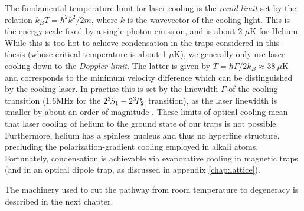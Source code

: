 
	The fundamental temperature limit for laser cooling is the \emph{recoil limit} set by the relation $k_B T = \hbar^2k^2/2m$, where $k$ is the wavevector of the cooling light.
	This is the energy scale fixed by a single-photon emission, and is about 2 $\mu$K for Helium.
	While this is too hot to achieve condensation in the traps considered in this thesis (whose critical temperature is about 1 $\mu$K), we generally only use laser cooling down to the \emph{Doppler limit}.
	The latter is given by $T = \hbar\Gamma/2 k_B\approx 38~\mu$K and corresponds to the minimum velocity difference which can be distinguished by the cooling laser.
	In practise this is set by the linewidth $\Gamma$ of the cooling transition (1.6MHz for the $2^{3\!} S_1 - 2^{3\!} P_2$ transition), as the laser linewidth is smaller by about an order of magnitude \cite{Shin16}.
	These limits of optical cooling mean that laser cooling of helium to the ground state of our traps is not possible.
	Furthermore, helium has a spinless nucleus and thus no hyperfine structure, precluding the polarization-gradient cooling employed in alkali atoms.
	Fortunately, condensation is achievable via evaporative cooling in magnetic traps (and in an optical dipole trap, as discussed in appendix \ref{chap:lattice}).

	The machinery used to cut the pathway from room temperature to degeneracy is described in the next chapter. 